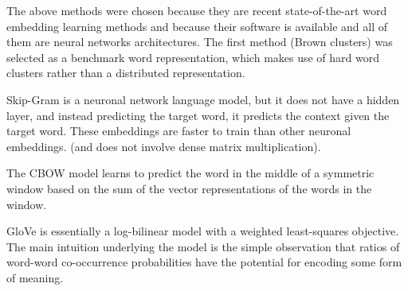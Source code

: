 The above methods were chosen because they are recent
state-of-the-art word embedding learning methods and because their software is
available and all of them are neural networks architectures.
The first method (Brown clusters) was selected as a benchmark word representation, which makes use of hard word clusters rather than a distributed representation.

Skip-Gram \cite{Mikolov13} is a neuronal network language model, but it does not have a hidden layer, and 
instead predicting the target word, it predicts the context given the target word.
These embeddings are faster to train than other neuronal embeddings.
(and does not involve dense matrix multiplication).

The CBOW \cite{Mikolov13NIPS} model learns to predict the word in the middle of a symmetric window based on the sum of the vector representations of the words in the window.

GloVe \cite{pennington2014glove} is essentially a log-bilinear model with a weighted least-squares objective. The main intuition underlying the model is the simple observation that ratios of word-word co-occurrence probabilities have the potential for encoding some form of meaning.




